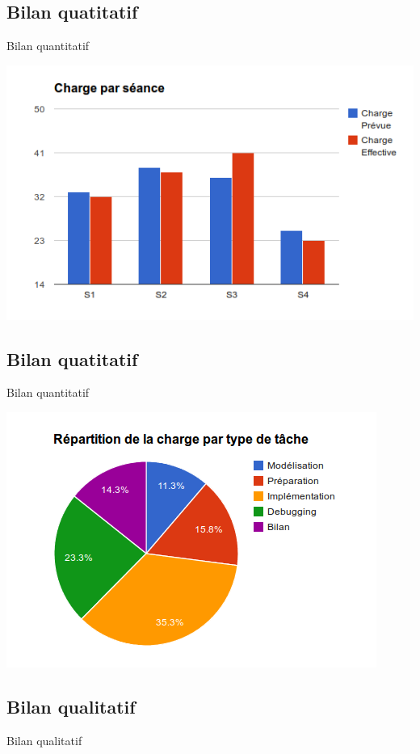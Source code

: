 \documentclass[aspectratio=169]{beamer}
\begin{document}
\subsection{Bilan quatitatif}
\begin{frame}{Bilan quantitatif}
\begin{center}
 \includegraphics[scale=0.5]{chargeseance}
\end{center} 
\end{frame}

\subsection{Bilan quatitatif}
\begin{frame}{Bilan quantitatif}
 \begin{center}
 \includegraphics[scale=0.5]{chargetype}
\end{center}
\end{frame}

\subsection{Bilan qualitatif}
\begin{frame}{Bilan qualitatif}
 
\end{frame}
\end{document}
